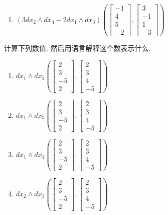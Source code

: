 \begin{question}
\begin{enumerate}
  \item[(f)] $(3dx_2\wedge dx_4-2dx_1\wedge dx_3)\left(\begin{bmatrix}-1\\4\\5\\-2\end{bmatrix},\begin{bmatrix}3\\-1\\1\\-3\end{bmatrix}\right)$
\end{enumerate}
\end{question}

\begin{question}\label{q:3-29}
计算下列数值. 然后用语言解释这个数表示什么.
\begin{enumerate}
  \item[(a)] $dx_1\wedge dx_2\left(\begin{bmatrix}2\\3\\-5\\2\end{bmatrix},\begin{bmatrix}2\\3\\4\\-5\end{bmatrix}\right)$
  \item[(b)] $dx_1\wedge dx_3\left(\begin{bmatrix}2\\3\\-5\\2\end{bmatrix},\begin{bmatrix}2\\3\\4\\-5\end{bmatrix}\right)$
  \item[(c)] $dx_1\wedge dx_4\left(\begin{bmatrix}2\\3\\-5\\2\end{bmatrix},\begin{bmatrix}2\\3\\4\\-5\end{bmatrix}\right)$
  \item[(d)] $dx_2\wedge dx_3\left(\begin{bmatrix}2\\3\\-5\\2\end{bmatrix},\begin{bmatrix}2\\3\\4\\-5\end{bmatrix}\right)$

\end{enumerate}
\end{question}
